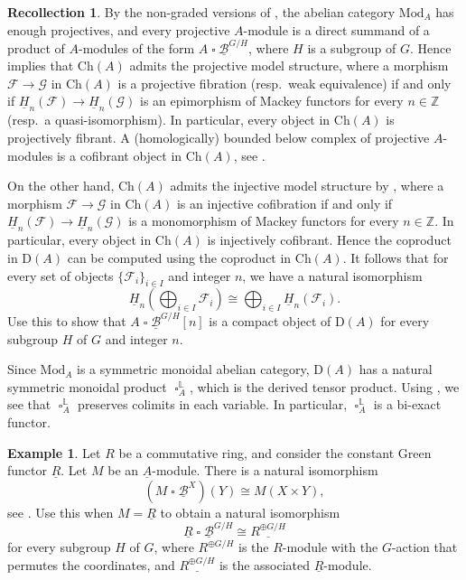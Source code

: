 \documentclass[10pt]{amsart}
\theoremstyle{definition}
\newtheorem{exm}[thm]{Example}
\newtheorem{recoll}[thm]{Recollection}
\numberwithin{equation}{section}
\renewcommand{\L}{\mathbb{L}}
\newcommand{\Z}{\mathbb{Z}}
\newcommand{\cB}{\mathcal{B}}
\newcommand{\cF}{\mathcal{F}}
\newcommand{\cG}{\mathcal{G}}
\newcommand{\rD}{\mathrm{D}}
\newcommand{\ul}{\underline}
\newcommand{\Mod}{\mathrm{Mod}}
\newcommand{\Ch}{\mathrm{Ch}}
\DeclareMathOperator{\sotimes}{\square}
\begin{document}
\begin{recoll}
By the non-graded versions of \cite[Propositions 4.3, 4.4]{LM06},
the abelian category $\Mod_{A}$ has enough projectives,
and every projective $A$-module is a direct summand of a product of $A$-modules of the form $A\sotimes \ul{\cB}^{G/H}$,
where $H$ is a subgroup of $G$.
Hence \cite[Theorem 2.2]{CH02} implies that $\Ch(A)$ admits the projective model structure,
where a morphism $\cF\to \cG$ in $\Ch(A)$ is a projective fibration (resp.\ weak equivalence) if and only if $\ul{H}_n(\cF)\to \ul{H}_n(\cG)$ is an epimorphism of Mackey functors for every $n\in \Z$ (resp.\ a quasi-isomorphism).
In particular,
every object in $\Ch(A)$ is projectively fibrant.
A (homologically) bounded below complex of projective $A$-modules is a cofibrant object in $\Ch(A)$,
see \cite[Lemma 2.7(b)]{CH02}.

On the other hand,
$\Ch(A)$ admits the injective model structure by \cite[Proposition 3.13]{Bek00},
where a morphism $\cF\to \cG$ in $\Ch(A)$ is an injective cofibration if and only if $\ul{H}_n(\cF)\to \ul{H}_n(\cG)$ is a monomorphism of Mackey functors for every $n\in \Z$.
In particular,
every object in $\Ch(A)$ is injectively cofibrant.
Hence the coproduct in $\rD(A)$ can be computed using the coproduct in $\Ch(A)$.
It follows that for every set of objects $\{\cF_i\}_{i\in I}$ and integer $n$,
we have a natural isomorphism
\[
\ul{H}_n(\bigoplus_{i\in I} \cF_i)
\cong
\bigoplus_{i\in I} \ul{H}_n(\cF_i).
\]
Use this to show that  $A\sotimes \ul{\cB}^{G/H}[n]$ is a compact object of $\rD(A)$ for every subgroup $H$ of $G$ and integer $n$.


Since $\Mod_{A}$ is a symmetric monoidal abelian category,
$\rD(A)$ has a natural symmetric monoidal product $\sotimes_{A}^\L$,
which is the derived tensor product.
Using \cite[Lemma 4.1.8.8]{HA},
we see that $\sotimes_{A}^\L$ preserves colimits in each variable.
In particular,
$\sotimes_{A}^\L$ is a bi-exact functor.
\end{recoll}

\begin{exm}
Let $R$ be a commutative ring,
and consider the constant Green functor $\ul{R}$.
Let $M$ be an $\ul{A}$-module.
There is a natural isomorphism
\[
(M\sotimes \ul{\cB}^X)(Y)
\cong
M(X\times Y),
\]
see \cite[p.\ 519]{LM06}.
Use this when $M=\ul{R}$ to obtain a natural isomorphism
\[
\ul{R}\sotimes \ul{\cB}^{G/H}
\cong
\ul{R^{\oplus G/H}}
\]
for every subgroup $H$ of $G$,
where $R^{\oplus G/H}$ is the $R$-module with the $G$-action that permutes the coordinates,
and $\ul{R^{\oplus G/H}}$ is the associated $\ul{R}$-module.
\end{exm}
\end{document}
